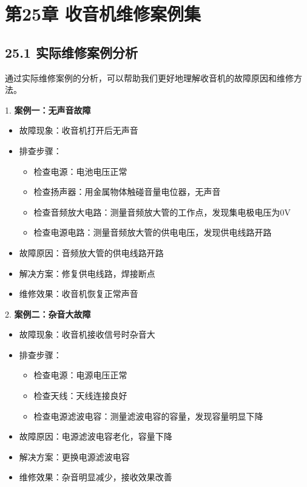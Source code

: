 \documentclass[12pt,UTF8]{ctexbook}
\begin{document}
\chapter*{第25章 收音机维修案例集}
\section*{25.1 实际维修案例分析}

通过实际维修案例的分析，可以帮助我们更好地理解收音机的故障原因和维修方法。

1. \textbf{案例一：无声音故障}
   \begin{itemize}[leftmargin=3.5em]
   \item 故障现象：收音机打开后无声音
   \item 排查步骤：
     \begin{itemize}
     \item 检查电源：电池电压正常
     \item 检查扬声器：用金属物体触碰音量电位器，无声音
     \item 检查音频放大电路：测量音频放大管的工作点，发现集电极电压为0V
     \item 检查电源电路：测量音频放大管的供电电压，发现供电线路开路
     \end{itemize}
   \item 故障原因：音频放大管的供电线路开路
   \item 解决方案：修复供电线路，焊接断点
   \item 维修效果：收音机恢复正常声音
   \end{itemize}

2. \textbf{案例二：杂音大故障}
   \begin{itemize}[leftmargin=3.5em]
   \item 故障现象：收音机接收信号时杂音大
   \item 排查步骤：
     \begin{itemize}
     \item 检查电源：电源电压正常
     \item 检查天线：天线连接良好
     \item 检查电源滤波电容：测量滤波电容的容量，发现容量明显下降
     \end{itemize}
   \item 故障原因：电源滤波电容老化，容量下降
   \item 解决方案：更换电源滤波电容
   \item 维修效果：杂音明显减少，接收效果改善
   \end{itemize}
\end{document}
